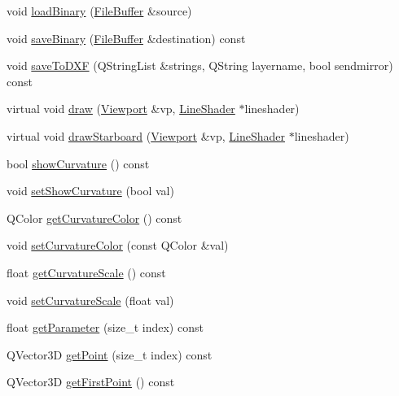 \begin{DoxyCompactItemize}
\item 
void \hyperlink{classShipCAD_1_1Spline_ae90c8807fb8058d6309f47db64e2d40e}{load\-Binary} (\hyperlink{classShipCAD_1_1FileBuffer}{File\-Buffer} \&source)
\item 
void \hyperlink{classShipCAD_1_1Spline_a5abb8df513d25abe8b0ec000a7926a66}{save\-Binary} (\hyperlink{classShipCAD_1_1FileBuffer}{File\-Buffer} \&destination) const 
\item 
void \hyperlink{classShipCAD_1_1Spline_a33a6300e79043b2fee45cb0eca0696bb}{save\-To\-D\-X\-F} (Q\-String\-List \&strings, Q\-String layername, bool sendmirror) const 
\item 
virtual void \hyperlink{classShipCAD_1_1Spline_a6424ed433d241f566c15891cc25a74dd}{draw} (\hyperlink{classShipCAD_1_1Viewport}{Viewport} \&vp, \hyperlink{classShipCAD_1_1LineShader}{Line\-Shader} $\ast$lineshader)
\item 
virtual void \hyperlink{classShipCAD_1_1Spline_aa1dcf2a9cff6d17afd926219e3791f9f}{draw\-Starboard} (\hyperlink{classShipCAD_1_1Viewport}{Viewport} \&vp, \hyperlink{classShipCAD_1_1LineShader}{Line\-Shader} $\ast$lineshader)
\item 
bool \hyperlink{classShipCAD_1_1Spline_a2b6fa67f7463838ab2ee9d7b8381a9c5}{show\-Curvature} () const 
\item 
void \hyperlink{classShipCAD_1_1Spline_aae0f5ce3bc2aa58759abd32f3462bf16}{set\-Show\-Curvature} (bool val)
\item 
Q\-Color \hyperlink{classShipCAD_1_1Spline_a788c76b36b091f3d5b92c9cde414cb89}{get\-Curvature\-Color} () const 
\item 
void \hyperlink{classShipCAD_1_1Spline_ac40c22712433f98d657ecaed459d03a0}{set\-Curvature\-Color} (const Q\-Color \&val)
\item 
float \hyperlink{classShipCAD_1_1Spline_af82a5bc6171a9252de5e4c74bf1288e5}{get\-Curvature\-Scale} () const 
\item 
void \hyperlink{classShipCAD_1_1Spline_a17ba0378bfd4a39b4d96d914332c26e4}{set\-Curvature\-Scale} (float val)
\item 
float \hyperlink{classShipCAD_1_1Spline_a81c3cc38d6e70f968b53066bc98e1e01}{get\-Parameter} (size\-\_\-t index) const 
\item 
Q\-Vector3\-D \hyperlink{classShipCAD_1_1Spline_a04a94537b420a8d19dc5f78526e9a825}{get\-Point} (size\-\_\-t index) const 
\item 
Q\-Vector3\-D \hyperlink{classShipCAD_1_1Spline_aadd67f56435eea8bb6c74c3aa073c21d}{get\-First\-Point} () const 
\item 

\end{DoxyCompactItemize}

